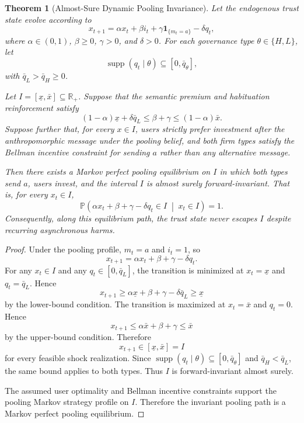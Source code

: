 \documentclass[review,authoryear]{elsarticle}
\newtheorem{theorem}{Theorem}
\theoremstyle{definition}
\theoremstyle{plain}
\begin{document}
\begin{theorem}[Almost-Sure Dynamic Pooling Invariance]
\label{thm:dynamic-pooling-invariance}
Let the endogenous trust state evolve according to
\[
x_{t+1}
=
\alpha x_t+\beta i_t+\gamma\mathbf 1_{\{m_t=a\}}-\delta q_t,
\]
where $\alpha\in(0,1)$, $\beta\ge 0$, $\gamma>0$, and $\delta>0$.
For each governance type $\theta\in\{H,L\}$, let
\[
\operatorname{supp}(q_t\mid \theta)\subseteq [0,\bar q_\theta],
\]
with $\bar q_L>\bar q_H\ge 0$.

Let $I=[\underline x,\bar x]\subseteq \mathbb R_+$.
Suppose that the semantic premium and habituation reinforcement satisfy
\[
(1-\alpha)\underline{x}+\delta\bar q_L
\le
\beta+\gamma
\le
(1-\alpha)\bar{x}.
\]
Suppose further that, for every $x\in I$, users strictly prefer investment
after the anthropomorphic message under the pooling belief, and both firm
types satisfy the Bellman incentive constraint for sending $a$ rather than
any alternative message.

Then there exists a Markov perfect pooling equilibrium on $I$ in which both
types send $a$, users invest, and the interval $I$ is almost surely
forward-invariant. That is, for every $x_t\in I$,
\[
\mathbb P
\left(
\alpha x_t+\beta+\gamma-\delta q_t\in I
\;\middle|\;
x_t\in I
\right)
=
1.
\]
Consequently, along this equilibrium path, the trust state never escapes
$I$ despite recurring asynchronous harms.
\end{theorem}
\begin{proof}
Under the pooling profile, $m_t=a$ and $i_t=1$, so
\[
x_{t+1}
=
\alpha x_t+\beta+\gamma-\delta q_t.
\]
For any $x_t\in I$ and any $q_t\in[0,\bar q_L]$, the transition is minimized
at $x_t=\underline x$ and $q_t=\bar q_L$. Hence
\[
x_{t+1}
\ge
\alpha\underline x+\beta+\gamma-\delta\bar q_L
\ge
\underline x
\]
by the lower-bound condition. The transition is maximized at
$x_t=\bar x$ and $q_t=0$. Hence
\[
x_{t+1}
\le
\alpha\bar x+\beta+\gamma
\le
\bar x
\]
by the upper-bound condition. Therefore
\[
x_{t+1}\in[\underline x,\bar x]=I
\]
for every feasible shock realization. Since
$\operatorname{supp}(q_t\mid\theta)\subseteq[0,\bar q_\theta]$ and
$\bar q_H<\bar q_L$, the same bound applies to both types. Thus $I$ is
forward-invariant almost surely.

The assumed user optimality and Bellman incentive constraints support the
pooling Markov strategy profile on $I$. Therefore the invariant pooling path
is a Markov perfect pooling equilibrium.
\end{proof}
\end{document}
